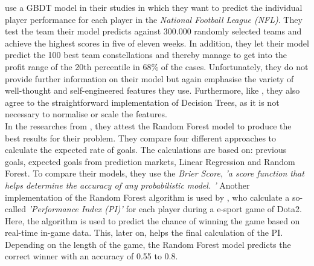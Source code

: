 \citet{landers_machine_2017} use a GBDT model in their studies in which they want to predict the individual player performance for each player in the \emph{National Football League (NFL)}. They test the team their model predicts against 300.000 randomly selected teams and achieve the highest scores in five of eleven weeks. In addition, they let their model predict the 100 best team constellations and thereby manage to get into the profit range of the 20th percentile in 68\% of the cases. Unfortunately, they do not provide further information on their model but again emphasise the variety of well-thought and self-engineered features they use. Furthermore, like \citeauthor{deng_analysis_2020}, they also agree to the straightforward implementation of Decision Trees, as it is not necessary to normalise or scale the features. \parencite[cf.][, p. 6]{landers_machine_2017} \\
In the researches from \citet{shah_poisson_2021}, they attest the Random Forest model to produce the best results for their problem. They compare four different approaches to calculate the expected rate of goals. The calculations are based on: previous goals, expected goals from prediction markets, Linear Regression and Random Forest. To compare their models, they use the \emph{Brier Score}, \emph{'a score function that helps determine the accuracy of any probabilistic model. '} \parencite[, p. 7]{shah_poisson_2021} Another implementation of the Random Forest algorithm is used by \citet{demediuk_performance_2021}, who calculate a so-called \emph{'Performance Index (PI)'} for each player during a e-sport game of Dota2. Here, the algorithm is used to predict the chance of winning the game based on real-time in-game data. This, later on, helps the final calculation of the PI. Depending on the length of the game, the Random Forest model predicts the correct winner with an accuracy of 0.55 to 0.8. \\
